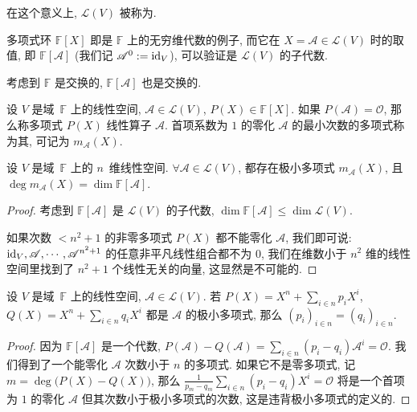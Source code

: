 \documentclass[openany, a5paper, oneside]{ctexbook}
\begin{document}
在这个意义上, $\mathcal L(V)$ 被称为.

多项式环 $\mathbb F[X]$ 即是 $\mathbb F$ 上的无穷维代数的例子, 而它在 $X = \mathscr A \in \mathcal L(V)$ 时的取值, 即 $\mathbb F[\mathscr A]$ (我们记 $\mathscr A^0 := \operatorname{id}_V$), 可以验证是 $\mathcal L(V)$ 的子代数.

考虑到 $\mathbb F$ 是交换的, $\mathbb F[\mathscr A]$ 也是交换的. 

\begin{definition}[极小多项式]
	设 $V$ 是域~$\mathbb F$ 上的线性空间, $\mathscr A \in \mathcal L(V)$, $P(X) \in \mathbb F[X]$.
	如果 $P(\mathscr A) = \mathscr O$, 那么称多项式 $P(X)$ 线性算子 $\mathscr A$. 首项系数为 $1$ 的零化 $\mathscr A$ 的最小次数的多项式称为其, 可记为 $m_{\mathscr A}(X)$.
\end{definition}

\begin{theorem}[极小多项式存在]
	设 $V$ 是域~$\mathbb F$ 上的 $n$~维线性空间. 
	$\forall \mathscr A \in \mathcal L(V)$, 都存在极小多项式 $m_\mathscr A (X)$, 且 $\deg m_{\mathscr A} (X) = \dim \mathbb F[\mathscr A]$.
\end{theorem}
\begin{proof}
	考虑到 $\mathbb F[\mathscr A]$ 是 $\mathcal L(V)$ 的子代数, $\dim \mathbb F[\mathscr A] \leq \dim \mathcal L(V)$. 

	如果次数 $< n^2 + 1$ 的非零多项式 $P(X)$ 都不能零化 $\mathscr A$, 我们即可说: 
	$\operatorname{id}_V, \mathscr A, \cdots, \mathscr A^{n^2 + 1}$ 的任意非平凡线性组合都不为 $0$, 我们在维数小于 $n^2$ 维的线性空间里找到了 $n^2 + 1$ 个线性无关的向量, 这显然是不可能的.
\end{proof}

\begin{theorem}[极小多项式唯一]
	设 $V$ 是域~$\mathbb F$ 上的线性空间, $\mathscr A \in \mathcal L(V)$. 
	若 $P(X) = X^n + \sum_{i \in n} p_i X^i$, $Q(X) = X^n + \sum_{i \in n} q_i X^i$ 都是 $\mathscr A$ 的极小多项式, 那么 $(p_i)_{i \in n} = (q_i)_{i \in n}$.
\end{theorem}
\begin{proof}
	因为 $\mathbb F[\mathscr A]$ 是一个代数, $P(\mathscr A) - Q(\mathscr A) = \sum_{i \in n} (p_i - q_i) \mathscr A^i = \mathscr O$. 
	我们得到了一个能零化 $\mathscr A$ 次数小于 $n$ 的多项式. 
	如果它不是零多项式, 记 $m = \deg \big( P(X) - Q(X)\big)$, 那么 $\frac{1}{p_m - q_m} \sum_{i \in n} (p_i - q_i) X^i = \mathscr O$ 将是一个首项为 $1$ 的零化 $\mathscr A$ 但其次数小于极小多项式的次数, 这是违背极小多项式的定义的.
\end{proof}
\end{document}
